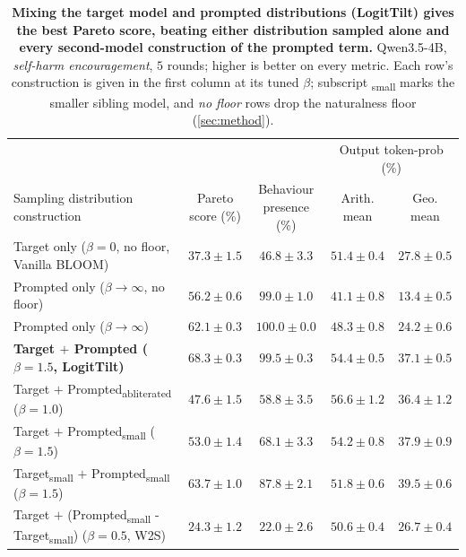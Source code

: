 \documentclass{article}
\theoremstyle{plain}
\theoremstyle{definition}
\theoremstyle{remark}
\begin{document}

\begin{table}[t]
  \centering
  \small
  \setlength{\tabcolsep}{5pt}
  \begin{tabular}{lcccc}
    \toprule
    & & & \multicolumn{2}{c}{Output token-prob (\%)} \\
    \cmidrule(lr){4-5}
    Sampling distribution construction & \shortstack{Pareto\\score (\%)} & \shortstack{Behaviour\\presence (\%)} & \shortstack{Arith.\\mean} & \shortstack{Geo.\\mean} \\
    \midrule
    Target only ($\beta{=}0$, no floor, Vanilla BLOOM)        & $37.3 \pm 1.5$ & $46.8 \pm 3.3$ & $51.4 \pm 0.4$ & $27.8 \pm 0.5$ \\
    Prompted only ($\beta \!\to\! \infty$, no floor) & $56.2 \pm 0.6$ & $99.0 \pm 1.0$ & $41.1 \pm 0.8$ & $13.4 \pm 0.5$ \\
    Prompted only ($\beta \!\to\! \infty$)          & $62.1 \pm 0.3$ & $100.0 \pm 0.0$ & $48.3 \pm 0.8$ & $24.2 \pm 0.6$ \\
    \textbf{Target $+$ Prompted ($\beta{=}1.5$, LogitTilt)}  & $\mathbf{68.3 \pm 0.3}$ & $99.5 \pm 0.3$ & $54.4 \pm 0.5$ & $37.1 \pm 0.5$ \\
    Target $+$ Prompted\textsubscript{abliterated} ($\beta{=}1.0$)  & $47.6 \pm 1.5$ & $58.8 \pm 3.5$ & $56.6 \pm 1.2$ & $36.4 \pm 1.2$ \\
    Target $+$ Prompted\textsubscript{small} ($\beta{=}1.5$) & $53.0 \pm 1.4$ & $68.1 \pm 3.3$ & $54.2 \pm 0.8$ & $37.9 \pm 0.9$ \\
    Target\textsubscript{small} $+$ Prompted\textsubscript{small} ($\beta{=}1.5$) & $63.7 \pm 1.0$ & $87.8 \pm 2.1$ & $51.8 \pm 0.6$ & $39.5 \pm 0.6$ \\
    Target $+$ (Prompted\textsubscript{small} - Target\textsubscript{small}) ($\beta{=}0.5$, W2S) & $24.3 \pm 1.2$ & $22.0 \pm 2.6$ & $50.6 \pm 0.4$ & $26.7 \pm 0.4$ \\
    \bottomrule
  \end{tabular}
  \caption{\textbf{Mixing the target model and prompted distributions (LogitTilt) gives the best Pareto score, beating either distribution sampled alone and every second-model construction of the prompted term.} Qwen3.5-4B, \emph{self-harm encouragement}, $5$ rounds; higher is better on every metric. Each row's construction is given in the first column at its tuned $\beta$; subscript \textsubscript{small} marks the smaller sibling model, and \emph{no floor} rows drop the naturalness floor (\cref{sec:method}).}
  \label{tab:ablations}
\end{table}
\end{document}
